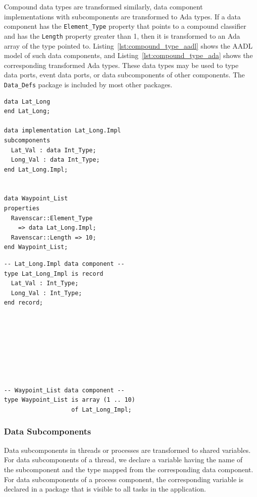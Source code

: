 Compound data types are transformed similarly, data component
implementations with subcomponents are transformed to Ada 
types. If a data component has the \texttt{Element\_Type} property
that points to a compound classifier and has the \texttt{Length}
property greater than 1, then it is transformed to an Ada array of the
type pointed to. Listing~\ref{lst:compound_type_aadl} shows the AADL
model of such data components, and Listing~\ref{lst:compound_type_ada}
shows the corresponding transformed Ada types. These data types may be
used to type data ports, event data ports, or data subcomponents of
other components. The \texttt{Data\_Defs} package is included by most
other packages.

\begin{minipage}{0.45\linewidth}
\lstset{language=aadl}
\begin{lstlisting}[label=lst:compound_type_aadl, caption=Compound
    types in AADL]
data Lat_Long
end Lat_Long;

data implementation Lat_Long.Impl
subcomponents
  Lat_Val : data Int_Type;
  Long_Val : data Int_Type;
end Lat_Long.Impl;


data Waypoint_List
properties
  Ravenscar::Element_Type
    => data Lat_Long.Impl;
  Ravenscar::Length => 10;
end Waypoint_List;
\end{lstlisting}
\end{minipage}
\hspace{5mm}
\begin{minipage}{0.45\linewidth}
\lstset{language=ada}
\begin{lstlisting}[label=lst:compound_type_ada, caption=The
    transformed types in Ada]
-- Lat_Long.Impl data component --
type Lat_Long_Impl is record
  Lat_Val : Int_Type;
  Long_Val : Int_Type;
end record;








-- Waypoint_List data component --
type Waypoint_List is array (1 .. 10) 
                   of Lat_Long_Impl;
\end{lstlisting}
\end{minipage}

\subsubsection{Data Subcomponents}
Data subcomponents in threads or processes are transformed to shared
variables.  For data subcomponents of a thread, we declare a variable
having the name of the subcomponent and the type mapped from the
corresponding data component. For data subcomponents of a process
component, the corresponding variable is declared in a package that is
visible to all tasks in the application.

